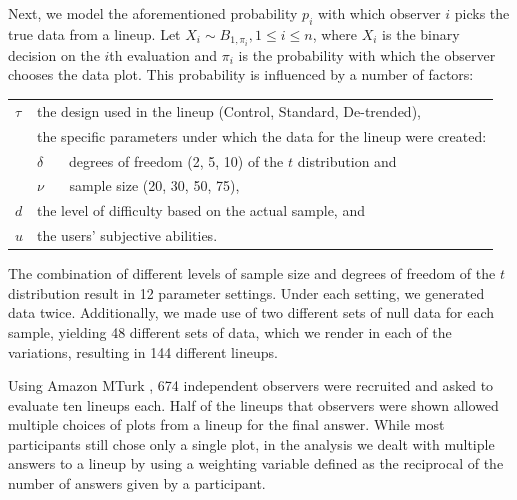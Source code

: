 \documentclass{article}\usepackage[]{graphicx}\usepackage[]{color}
\begin{document}
Next, we model the aforementioned probability $p_i$ with which observer $i$ picks the true data from a lineup. 
Let $X_i \sim B_{1, \pi_i}, 1 \le i \le n$, where $X_i$ is the binary decision on the $i$th evaluation and $\pi_i$ is the probability with which the observer chooses the data plot. This probability is influenced by a number of factors:

\begin{center}
\begin{tabular}{lp{5in}}
$\tau$ & the design used in the lineup (Control, Standard, De-trended), \\
&  the specific parameters under which the data for the lineup were created: \\
&  $\delta$ \ \ \ degrees of freedom (2, 5, 10) {of the $t$ distribution} and \\
&  $\nu$  \ \ \ sample size (20, 30, 50, 75), \\
$d$ &  the level of difficulty based on the actual sample, and \\
$u$ & the users' subjective abilities.
 \end{tabular}
\end{center}
%

%
The combination of different levels of sample size and degrees of freedom of the $t$ distribution result in 12 parameter settings. Under each setting, we  generated data twice. Additionally, we made use of two different sets of null data for each sample, yielding 48 different sets of data, which we render in each of the variations, resulting in 144 different lineups. 


Using  Amazon MTurk \citep{amazon}, 674 independent observers were recruited and asked to evaluate ten lineups each. 
%
Half of the lineups that observers were shown allowed multiple choices of plots from a lineup for the final answer. While most participants still chose only a single plot, in the analysis we dealt with multiple answers to a lineup by using a weighting variable defined as the reciprocal of the number of answers given by a participant.
\end{document}
